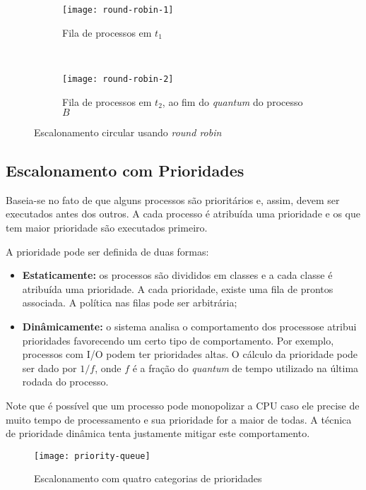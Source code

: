 \begin{figure*}[h]
  \begin{subfigure}[t]{0.45\textwidth}
    \texttt{[image: round-robin-1]}
    \caption{Fila de processos em $t_1$}
    \label{fig:round-robin-1}
  \end{subfigure}
  ~
  \begin{subfigure}[t]{0.45\textwidth}
    \texttt{[image: round-robin-2]}
    \caption{Fila de processos em $t_2$, ao fim do \textit{quantum} do processo $B$}
    \label{fig:round-robin-2}
  \end{subfigure}

  \caption{Escalonamento circular usando \textit{round robin}}
  \label{fig:round-robin}
\end{figure*}



\subsection{Escalonamento com Prioridades}
Baseia-se no fato de que alguns processos são prioritários e, assim, devem ser executados antes dos outros. A cada processo é atribuída uma prioridade e os que tem maior prioridade são executados primeiro.

A prioridade pode ser definida de duas formas:
\begin{itemize}
  \item \textbf{Estaticamente:} os processos são divididos em classes e a cada classe é atribuída uma prioridade. A cada prioridade, existe uma fila de prontos associada. A política nas filas pode ser arbitrária;

  \item \textbf{Dinâmicamente:} o sistema analisa o comportamento dos processose atribui prioridades favorecendo um certo tipo de comportamento. Por exemplo, processos com I/O podem ter prioridades altas. O cálculo da prioridade pode ser dado por $1/f$, onde $f$ é a fração do \textit{quantum} de tempo utilizado na última rodada do processo.
\end{itemize}

 Note que é possível que um processo pode monopolizar a CPU caso ele precise de muito tempo de processamento e sua prioridade for a maior de todas. A técnica de prioridade dinâmica tenta justamente mitigar este comportamento.

\begin{figure}[h]
  \centering
  \texttt{[image: priority-queue]}
  \caption{Escalonamento com quatro categorias de prioridades}
  \label{fig:priority-queue}
\end{figure}




